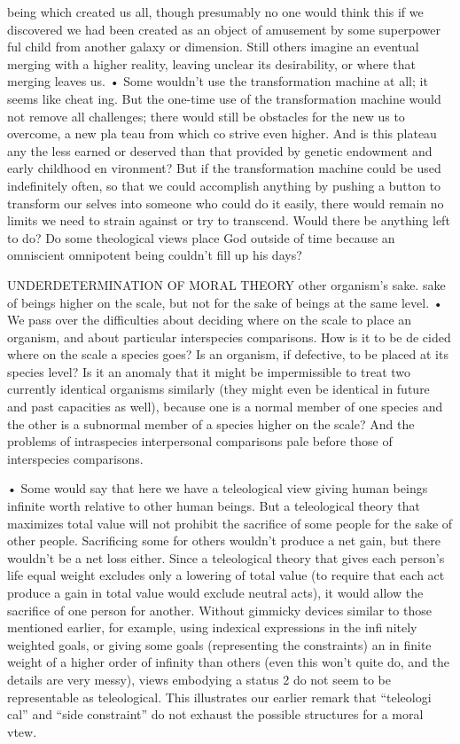 \documentclass[11pt,openany]{book}
\begin{document}
{being which created us all, though presumably no one would think this if we discovered we had been created as an object of amusement by some superpower ful child from another galaxy or dimension. Still others imagine an eventual merging with a higher reality, leaving unclear its desirability, or where that merging leaves us. • Some wouldn't use the transformation machine at all; it seems like cheat ing. But the one-time use of the transformation machine would not remove all challenges; there would still be obstacles for the new us to overcome, a new pla teau from which co strive even higher. And is this plateau any the less earned or deserved than that provided by genetic endowment and early childhood en vironment? But if the transformation machine could be used indefinitely often, so that we could accomplish anything by pushing a button to transform our selves into someone who could do it easily, there would remain no limits we need to strain against or try to transcend. Would there be anything left to do? Do some theological views place God outside of time because an omniscient omnipotent being couldn't fill up his days?\par

UNDERDETERMINATION OF MORAL THEORY other organism's sake. sake of beings higher on the scale, but not for the sake of beings at the same level. • We pass over the difficulties about deciding where on the scale to place an organism, and about particular interspecies comparisons. How is it to be de cided where on the scale a species goes? Is an organism, if defective, to be placed at its species level? Is it an anomaly that it might be impermissible to treat two currently identical organisms similarly (they might even be identical in future and past capacities as well), because one is a normal member of one species and the other is a subnormal member of a species higher on the scale? And the problems of intraspecies interpersonal comparisons pale before those of interspecies comparisons.\par

• Some would say that here we have a teleological view giving human beings infinite worth relative to other human beings. But a teleological theory that maximizes total value will not prohibit the sacrifice of some people for the sake of other people. Sacrificing some for others wouldn't produce a net gain, but there wouldn't be a net loss either. Since a teleological theory that gives each person's life equal weight excludes only a lowering of total value (to require that each act produce a gain in total value would exclude neutral acts), it would allow the sacrifice of one person for another. Without gimmicky devices similar to those mentioned earlier, for example, using indexical expressions in the infi nitely weighted goals, or giving some goals (representing the constraints) an in finite weight of a higher order of infinity than others (even this won't quite do, and the details are very messy), views embodying a status 2 do not seem to be representable as teleological. This illustrates our earlier remark that ``teleologi cal'' and ``side constraint'' do not exhaust the possible structures for a moral vtew.\par

}
\end{document}
